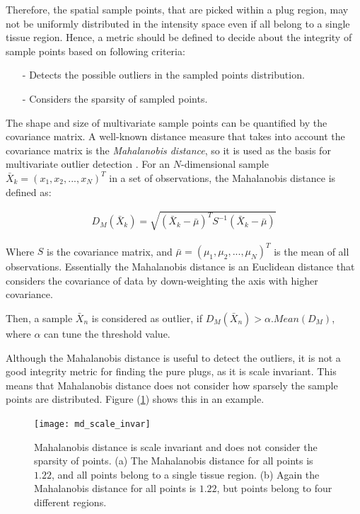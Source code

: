Therefore, the spatial sample points, that are picked within a plug region, may not be uniformly distributed in the intensity space even if all belong to a single tissue region.
Hence, a metric should be defined to decide about the integrity of sample points based on following criteria:

\begin{itemize}
    \item[-] Detects the possible outliers in the sampled points distribution.
    \item[-] Considers the sparsity of sampled points.
\end{itemize}

The shape and size of multivariate sample points can be quantified by the covariance matrix. A well-known distance measure that takes into account the covariance matrix is the \textit{Mahalanobis distance}, so it is used as the basis for multivariate outlier detection \cite{filzmoser2004}.
For an $N$-dimensional sample $\bar{X}_k = (x_1, x_2, ..., x_N)^{T}$ in a set of observations, the Mahalanobis distance is defined as:

\begin{equation}
\begin{gathered}
D_M(\bar{X}_k)=\sqrt{(\bar{X}_k-\bar{\mu})^T S^{-1} (\bar{X}_k-\bar{\mu})}
\end{gathered}
\end{equation}

Where $S$ is the covariance matrix, and $\bar{\mu} = (\mu_1, \mu_2, ..., \mu_N)^{T}$ is the mean of all observations.
Essentially the Mahalanobis distance is an Euclidean distance that considers the covariance of data by down-weighting the axis with higher covariance.

Then, a sample $\bar{X}_n$ is considered as outlier, if $D_M(\bar{X}_n) > \alpha.Mean(D_M)$, where $\alpha$ can tune the threshold value.

Although the Mahalanobis distance is useful to detect the outliers, it is not a good integrity metric for finding the pure plugs, as it is scale invariant. This means that Mahalanobis distance does not consider how sparsely the sample points are distributed. Figure (\ref{fig:md_scale_invar}) shows this in an example.

\begin{figure}
\centering
\texttt{[image: md\_scale\_invar]}\
\centering
\caption{Mahalanobis distance is scale invariant and does not consider the sparsity of points. (a) The Mahalanobis distance for all points is $1.22$, and all points belong to a single tissue region. (b) Again the Mahalanobis distance for all points is $1.22$, but points belong to four different regions.}
\label{fig:md_scale_invar}
\end{figure}

